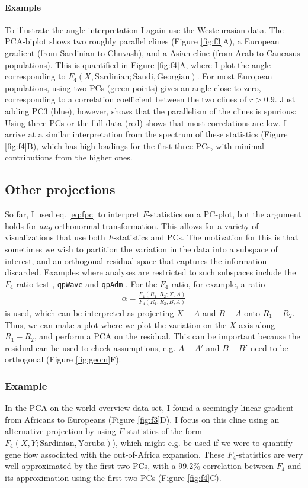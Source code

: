 \documentclass[12pt,fullpage, a4paper]{article}
\begin{document}
\paragraph{Example}
To illustrate the angle interpretation I again use the Westeurasian data. The PCA-biplot shows two roughly parallel clines (Figure \ref{fig:f3}A), a European gradient (from Sardinian to Chuvash), and a Asian cline (from Arab to Caucasus populations). This is quantified in Figure \ref{fig:f4}A, where I plot the angle corresponding to $F_4(X, \text{Sardinian}; \text{Saudi}, \text{Georgian})$. For most European populations, using two PCs (green points) gives an angle close to zero, corresponding to a correlation coefficient between the two clines of $r>0.9$. Just adding PC3 (blue), however, shows that the parallelism of the clines is spurious: Using three PCs or the full data (red) shows that most correlations are low. I arrive at a similar interpretation from the spectrum of these statistics (Figure \ref{fig:f4}B), which has high loadings for the first three PCs, with minimal contributions from the higher ones.

\subsection{Other projections}
So far, I used eq. \ref{eq:fpc} to interpret $F$-statistics on a PC-plot, but the argument holds for \emph{any} orthonormal transformation. This allows for a variety of visualizations that use both $F$-statistics and PCs. The motivation for this is that sometimes we wish to partition the variation in the data into a subspace of interest, and an orthogonal residual space that captures the information discarded. Examples where analyses are restricted to such subspaces include the $F_4$-ratio test \citep{patterson2012, petr2019}, \texttt{qpWave} \citep{skoglund2015} and \texttt{qpAdm} \citep{harney2021}. For the $F_4$-ratio, for example, a ratio
\begin{eqnarray}
\alpha = \frac{F_4(R_1, R_2; X, A)}{F_4(R_1, R_2; B, A)}  \label{eq:f4ratio}
\end{eqnarray}
is used, which can be interpreted as projecting $X-A$ and $B-A$ onto $R_1 - R_2$. Thus, we can make a plot where we plot the variation on the $X$-axis along $R_1 - R_2$, and perform a PCA on the residual. This can be important because the residual can be used to check assumptions, e.g. $A - A'$ and $B - B'$ need to be orthogonal (Figure \ref{fig:geom}F).

\subsubsection{Example}
In the PCA on the world overview data set, I found a seemingly linear gradient from Africans to Europeans (Figure \ref{fig:f3}D). I focus on this cline using an alternative projection by using  $F$-statistics of the form $F_4(X, Y; \text{Sardinian}, \text{Yoruba})$), which might e.g. be used if we were to quantify gene flow associated with the out-of-Africa expansion. These $F_4$-statistics are very well-approximated by the first two PCs, with a 99.2\% correlation between $F_4$ and its approximation using the first two PCs (Figure \ref{fig:f4}C).
\end{document}
